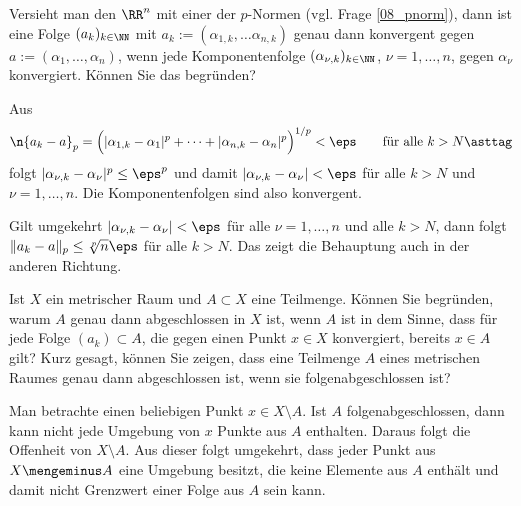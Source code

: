 \begin{frage}
  Versieht man den $\RR^n$ mit einer der $p$-Normen 
  (vgl. Frage \ref{08_pnorm}), 
  dann ist eine Folge $(a_k)_{k\in \NN}$ 
  mit $a_k := (\alpha_{1,k}, \ldots \alpha_{n,k} )$ genau dann konvergent 
  gegen $a:=(\alpha_1,\ldots,\alpha_n)$, wenn jede Komponentenfolge 
  $(\alpha_{\nu,k})_{k\in \NN}$, $\nu=1,\ldots,n$, 
  gegen $\alpha_\nu$ konvergiert. Können Sie das begründen?
\end{frage}

\begin{antwort}
  Aus 
  \begin{equation}
    \n{ a_k - a }_p = \Big( |\alpha_{1,k}-\alpha_1|^p + 
    \cdots +|\alpha_{n,k}-\alpha_n|^p 
    \Big)^{1/p} 
    < \eps \qquad\text{für alle $k>N$}
    \asttag
  \end{equation}
  folgt $| \alpha_{\nu,k} - \alpha_\nu |^p \le \eps^p $ und damit 
  $| \alpha_{\nu,k} - \alpha_\nu | < \eps $ für alle 
  $k>N$ und $\nu=1,\ldots, n$. Die 
  Komponentenfolgen sind also konvergent.

  Gilt umgekehrt $| \alpha_{\nu,k} - \alpha_\nu | < \eps $ 
  für alle $\nu=1,\ldots, n$ 
  und alle $k>N$, dann folgt $\| a_k-a \|_p \le \sqrt[p]{n}\eps$ für 
  alle $k>N$. Das zeigt die Behauptung auch in der anderen Richtung. 
  \AntEnd
\end{antwort}


\begin{frage}\label{08_folgabg}
  Ist $X$ ein metrischer Raum und $A\subset X$ eine Teilmenge. Können Sie 
  begründen, warum $A$ genau dann abgeschlossen in $X$ ist, wenn $A$ 
   ist in dem Sinne, dass für jede Folge 
  $(a_k) \subset A$, die gegen einen Punkt $x\in X$ konvergiert, bereits 
  $x\in A$ gilt? Kurz gesagt, können Sie zeigen, dass eine Teilmenge 
  $A$ eines metrischen Raumes genau dann abgeschlossen ist, 
  wenn sie folgenabgeschlossen ist?
\end{frage}

\begin{antwort}
  Man betrachte einen beliebigen Punkt 
  $x\in X \setminus A$. Ist $A$ folgenabgeschlossen, dann kann nicht 
  jede Umgebung von $x$ Punkte aus $A$ enthalten. Daraus folgt die Offenheit 
  von $X\setminus A$. Aus dieser folgt umgekehrt, dass jeder Punkt aus 
  $X\mengeminus A$ eine Umgebung besitzt, die keine Elemente aus $A$ enthält 
  und damit nicht Grenzwert einer Folge aus $A$ sein kann.
  \AntEnd
\end{antwort}


